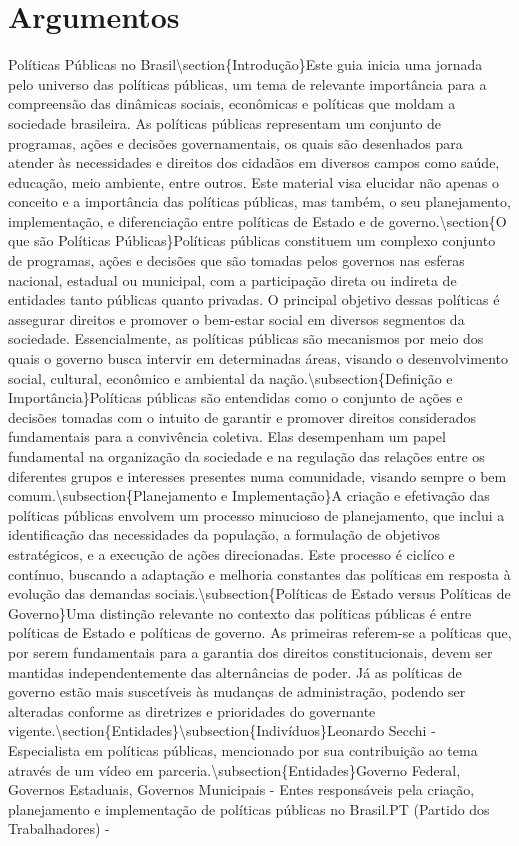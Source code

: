 \documentclass[
   article,       
   12pt,          
   oneside,       
   a4paper,       
   english,       
   brazil,        
   sumario=tradicional
   ]{abntex2}
\begin{document}
\section{Argumentos}
Políticas Públicas no Brasil\textbackslash{}section\{Introdução\}Este guia inicia uma jornada pelo universo das políticas públicas, um tema de relevante importância para a compreensão das dinâmicas sociais, econômicas e políticas que moldam a sociedade brasileira. As políticas públicas representam um conjunto de programas, ações e decisões governamentais, os quais são desenhados para atender às necessidades e direitos dos cidadãos em diversos campos como saúde, educação, meio ambiente, entre outros. Este material visa elucidar não apenas o conceito e a importância das políticas públicas, mas também, o seu planejamento, implementação, e diferenciação entre políticas de Estado e de governo.\textbackslash{}section\{O que são Políticas Públicas\}Políticas públicas constituem um complexo conjunto de programas, ações e decisões que são tomadas pelos governos nas esferas nacional, estadual ou municipal, com a participação direta ou indireta de entidades tanto públicas quanto privadas. O principal objetivo dessas políticas é assegurar direitos e promover o bem-estar social em diversos segmentos da sociedade. Essencialmente, as políticas públicas são mecanismos por meio dos quais o governo busca intervir em determinadas áreas, visando o desenvolvimento social, cultural, econômico e ambiental da nação.\textbackslash{}subsection\{Definição e Importância\}Políticas públicas são entendidas como o conjunto de ações e decisões tomadas com o intuito de garantir e promover direitos considerados fundamentais para a convivência coletiva. Elas desempenham um papel fundamental na organização da sociedade e na regulação das relações entre os diferentes grupos e interesses presentes numa comunidade, visando sempre o bem comum.\textbackslash{}subsection\{Planejamento e Implementação\}A criação e efetivação das políticas públicas envolvem um processo minucioso de planejamento, que inclui a identificação das necessidades da população, a formulação de objetivos estratégicos, e a execução de ações direcionadas. Este processo é ciclíco e contínuo, buscando a adaptação e melhoria constantes das políticas em resposta à evolução das demandas sociais.\textbackslash{}subsection\{Políticas de Estado versus Políticas de Governo\}Uma distinção relevante no contexto das políticas públicas é entre políticas de Estado e políticas de governo. As primeiras referem-se a políticas que, por serem fundamentais para a garantia dos direitos constitucionais, devem ser mantidas independentemente das alternâncias de poder. Já as políticas de governo estão mais suscetíveis às mudanças de administração, podendo ser alteradas conforme as diretrizes e prioridades do governante vigente.\textbackslash{}section\{Entidades\}\textbackslash{}subsection\{Indivíduos\}Leonardo Secchi - Especialista em políticas públicas, mencionado por sua contribuição ao tema através de um vídeo em parceria.\textbackslash{}subsection\{Entidades\}Governo Federal, Governos Estaduais, Governos Municipais - Entes responsáveis pela criação, planejamento e implementação de políticas públicas no Brasil.PT (Partido dos Trabalhadores) - 
\end{document}
